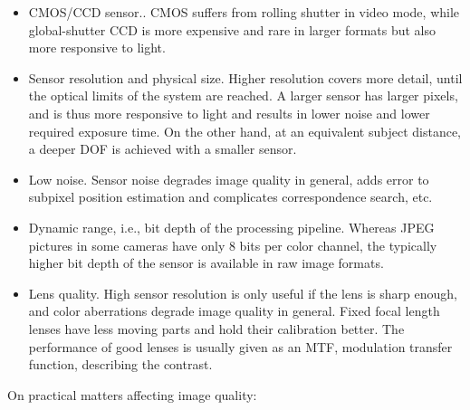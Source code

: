\begin{itemize}
	\item CMOS/CCD sensor..
		CMOS suffers from rolling shutter in video mode, while global-shutter CCD is more expensive and rare in larger formats but also more responsive to light.

	\item Sensor resolution and physical size.
		Higher resolution covers more detail, until the optical limits of the system are reached.
		A larger sensor has larger pixels, and is thus more responsive to light and results in lower noise and lower required exposure time.
		On the other hand, at an equivalent subject distance, a deeper DOF is achieved with a smaller sensor.

	\item Low noise.
		Sensor noise degrades image quality in general, adds error to subpixel position estimation and complicates correspondence search, etc.

	\item Dynamic range, i.e., bit depth of the processing pipeline.
		Whereas JPEG pictures in some cameras have only 8 bits per color channel, the typically higher bit depth of the sensor is available in raw image formats.

	\item Lens quality.
		High sensor resolution is only useful if the lens is sharp enough, and color aberrations degrade image quality in general.
		Fixed focal length lenses have less moving parts and hold their calibration better.
		The performance of good lenses is usually given as an MTF, modulation transfer function, describing the contrast.
\end{itemize}

On practical matters affecting image quality:

